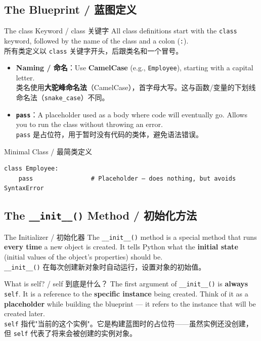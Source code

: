 \documentclass[11pt,a4paper]{report}
\let\oldtexttt\texttt
\renewcommand{\texttt}[1]{\textcolor{mainblue}{\oldtexttt{#1}}}
\begin{document}
\subsection{The Blueprint / 蓝图定义}

\begin{concept}{The class Keyword / class 关键字}
    All class definitions start with the \texttt{class} keyword, followed by the name of the class and a colon (\texttt{:}). \\
    所有类定义以 \texttt{class} 关键字开头，后跟类名和一个冒号。
    \begin{itemize}[itemsep=0.3em]
        \item \textbf{Naming / 命名}：Use \textbf{CamelCase} (e.g., \texttt{Employee}), starting with a capital letter. \\
        类名使用\textbf{大驼峰命名法}（CamelCase），首字母大写。这与函数/变量的下划线命名法（\texttt{snake\_case}）不同。
        \item \textbf{\texttt{pass}}：A placeholder used as a body where code will eventually go. Allows you to run the class without throwing an error. \\
        \texttt{pass} 是占位符，用于暂时没有代码的类体，避免语法错误。
    \end{itemize}
\end{concept}

\begin{examplebox}{Minimal Class / 最简类定义}
\begin{lstlisting}
class Employee:
    pass                # Placeholder — does nothing, but avoids SyntaxError
\end{lstlisting}
\end{examplebox}

\subsection{The \texttt{\_\_init\_\_()} Method / 初始化方法}

\begin{concept}{The Initializer / 初始化器}
    The \texttt{\_\_init\_\_()} method is a special method that runs \textbf{every time} a new object is created. It tells Python what the \textbf{initial state} (initial values of the object's properties) should be. \\
    \texttt{\_\_init\_\_()} 在每次创建新对象时自动运行，设置对象的初始值。
\end{concept}

\begin{warning}{What is self? / self 到底是什么？}
    The first argument of \texttt{\_\_init\_\_()} is \textbf{always} \texttt{self}. It is a reference to the \textbf{specific instance} being created. Think of it as a \textbf{placeholder} while building the blueprint — it refers to the instance that will be created later. \\
    \texttt{self} 指代"当前的这个实例"。它是构建蓝图时的占位符——虽然实例还没创建，但 \texttt{self} 代表了将来会被创建的实例对象。
\end{warning}
\end{document}
